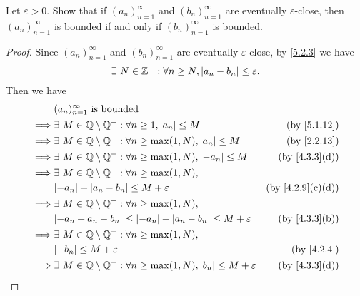 \begin{ex}\label{ex:5.2.2}
  Let \(\varepsilon > 0\).
  Show that if \((a_n)_{n = 1}^{\infty}\) and \((b_n)_{n = 1}^{\infty}\) are eventually \(\varepsilon\)-close, then \((a_n)_{n = 1}^{\infty}\) is bounded if and only if \((b_n)_{n = 1}^{\infty}\) is bounded.
\end{ex}

\begin{proof}
  Since \((a_n)_{n = 1}^{\infty}\) and \((b_n)_{n = 1}^{\infty}\) are eventually \(\varepsilon\)-close, by \cref{5.2.3} we have
  \[
    \exists\ N \in \mathbb{Z}^+ : \forall n \geq N, \left\lvert a_n - b_n\right\rvert \leq \varepsilon.
  \]
  Then we have
  \begin{align*}
             & (a_n)_{n = 1}^\infty \text{ is bounded}                                                                                       \\
    \implies & \exists\ M \in \Q \setminus \Q^- : \forall n \geq 1, \abs{a_n} \leq M                        & \text{(by \cref{5.1.12})}      \\
    \implies & \exists\ M \in \Q \setminus \Q^- : \forall n \geq \max(1, N), \abs{a_n} \leq M               & \text{(by \cref{2.2.13})}      \\
    \implies & \exists\ M \in \Q \setminus \Q^- : \forall n \geq \max(1, N), \abs{-a_n} \leq M              & \text{(by \cref{4.3.3}(d))}    \\
    \implies & \exists\ M \in \Q \setminus \Q^- : \forall n \geq \max(1, N),                                                                 \\
             & \abs{-a_n} + \abs{a_n - b_n} \leq M + \varepsilon                                            & \text{(by \cref{4.2.9}(c)(d))} \\
    \implies & \exists\ M \in \Q \setminus \Q^- : \forall n \geq \max(1, N),                                                                 \\
             & \abs{-a_n + a_n - b_n} \leq \abs{-a_n} + \abs{a_n - b_n} \leq M + \varepsilon                & \text{(by \cref{4.3.3}(b))}    \\
    \implies & \exists\ M \in \Q \setminus \Q^- : \forall n \geq \max(1, N),                                                                 \\
             & \abs{-b_n} \leq M + \varepsilon                                                              & \text{(by \cref{4.2.4})}       \\
    \implies & \exists\ M \in \Q \setminus \Q^- : \forall n \geq \max(1, N), \abs{b_n} \leq M + \varepsilon & \text{(by \cref{4.3.3}(d))}    \\

\end{align*}
\end{proof}
